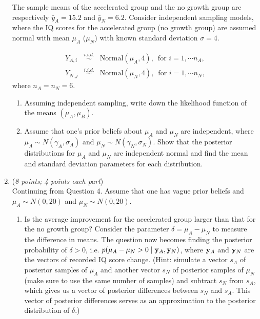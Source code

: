 \documentclass[11pt]{article}
\begin{document}
\begin{enumerate}
The sample means of the accelerated group and the no growth group are respectively $\bar{y}_A = 15.2$ and $\bar{y}_N = 6.2$.  Consider independent  sampling models, where the IQ scores for the accelerated group (no growth group) are assumed normal with mean $\mu_A$ ($\mu_N$) with known standard deviation $\sigma = 4$.

\begin{eqnarray}
Y_{A, i} &\overset{i.i.d.}{\sim}& \textrm{Normal}(\mu_A, 4), \,\,\, \text{for}\,\, i = 1, \cdots n_A, \\
Y_{N, j} &\overset{i.i.d.}{\sim}& \textrm{Normal}(\mu_N, 4), \,\,\, \text{for}\,\, i = 1, \cdots n_N, 
\end{eqnarray}
where $n_A = n_N = 6$. 

\begin{enumerate}
\item Assuming independent sampling, write down the likelihood function of the means $(\mu_A, \mu_B)$.
\item Assume that one's prior beliefs about $\mu_A$ and $\mu_N$ are independent, where $\mu_A \sim N(\gamma_A, \sigma_A)$ and $\mu_N \sim N(\gamma_N, \sigma_N)$.  Show that the posterior distributions for $\mu_A$ and $\mu_N$ are independent normal and find the mean and standard deviation parameters for each distribution.

\end{enumerate}


	\item
	({\it{8 points; 4 points each part}}) \\
Continuing from Question 4. Assume that one has vague prior beliefs and $\mu_A \sim N(0, 20)$ and $\mu_N \sim N(0, 20)$.

\begin{enumerate}

\item Is the average improvement for the accelerated group larger than that for the no growth group? Consider the parameter $\delta = \mu_A - \mu_N$ to measure the difference in means. The question now becomes finding the posterior probability of $\delta > 0$, i.e. $p(\mu_A - \mu_N > 0 \mid {\bf y}_A, {\bf y}_N)$, where ${\bf y}_A$ and ${\bf y}_N$ are the vectors of recorded IQ score change. (Hint: simulate a vector $s_A$ of posterior samples of $\mu_A$ and another vector $s_N$ of posterior samples of $\mu_N$ (make sure to use the same number of samples) and subtract $s_N$ from $s_A$, which gives us a vector of posterior differences between $s_N$ and $s_A$. This vector of posterior differences serves as an approximation to the posterior distribution of $\delta$.)


\end{enumerate}
\end{enumerate}
\end{document}

